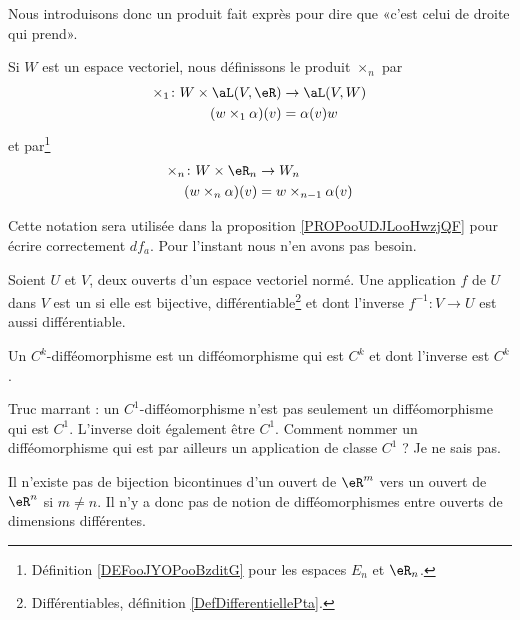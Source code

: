 Nous introduisons donc un produit fait exprès pour dire que «c'est celui de droite qui prend».
\begin{definition}       \label{DEFooLULCooYjBEaZ}
	Si \( W\) est un espace vectoriel, nous définissons le produit \( \times_n\) par
	\begin{equation}
		\begin{aligned}
			\times_1\colon W\times \aL(V,\eR) & \to \aL(V,W) \\
			(w\times_1\alpha)(v)              & =\alpha(v)w
		\end{aligned}
	\end{equation}
	et par\footnote{Définition \ref{DEFooJYOPooBzditG} pour les espaces \( E_n\) et \( \eR_n\).}
	\begin{equation}
		\begin{aligned}
			\times_n\colon W\times \eR_n & \to W_n                  \\
			(w\times_n\alpha)(v)         & =w\times_{n-1} \alpha(v)
		\end{aligned}
	\end{equation}
\end{definition}
Cette notation sera utilisée dans la proposition \ref{PROPooUDJLooHwzjQF} pour écrire correctement \( df_a\). Pour l'instant nous n'en avons pas besoin.



\begin{definition}[difféomorphisme]      \label{DefAQIQooYqZdya}
	Soient \( U\) et \( V\), deux ouverts d'un espace vectoriel normé. Une application \( f\) de \( U\) dans \( V\) est un  si elle est bijective, différentiable\footnote{Différentiables, définition \ref{DefDifferentiellePta}.} et dont l'inverse \( f^{-1}:V\to U \) est aussi différentiable.

	Un \( C^k\)-difféomorphisme est un difféomorphisme qui est \( C^k\) et dont l'inverse est \( C^k\).
\end{definition}

\begin{normaltext}
	Truc marrant : un \( C^1\)-difféomorphisme n'est pas seulement un difféomorphisme qui est \( C^1\). L'inverse doit également être \( C^1\). Comment nommer un difféomorphisme qui est par ailleurs un application de classe \( C^1\) ? Je ne sais pas.
\end{normaltext}

\begin{remark}  %
	Il n'existe pas de bijection bicontinues d'un ouvert de \( \eR^m\) vers un ouvert de \( \eR^n\) si \( m\neq n\). Il n'y a donc pas de notion de difféomorphismes entre ouverts de dimensions différentes.
\end{remark}

